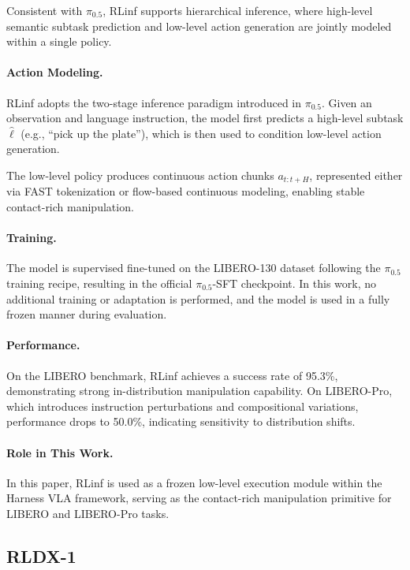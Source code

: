 \documentclass{article}
\begin{document}
Consistent with $\pi_{0.5}$, RLinf supports hierarchical inference, where high-level semantic subtask prediction and low-level action generation are jointly modeled within a single policy.

\paragraph{Action Modeling.}
RLinf adopts the two-stage inference paradigm introduced in $\pi_{0.5}$. Given an observation and language instruction, the model first predicts a high-level subtask $\hat{\ell}$ (e.g., “pick up the plate”), which is then used to condition low-level action generation.

The low-level policy produces continuous action chunks $a_{t:t+H}$, represented either via FAST tokenization or flow-based continuous modeling, enabling stable contact-rich manipulation.

\paragraph{Training.}
The model is supervised fine-tuned on the LIBERO-130 dataset following the $\pi_{0.5}$ training recipe, resulting in the official $\pi_{0.5}$-SFT checkpoint. In this work, no additional training or adaptation is performed, and the model is used in a fully frozen manner during evaluation.

\paragraph{Performance.}
On the LIBERO benchmark, RLinf achieves a success rate of 95.3\%, demonstrating strong in-distribution manipulation capability. On LIBERO-Pro, which introduces instruction perturbations and compositional variations, performance drops to 50.0\%, indicating sensitivity to distribution shifts.

\paragraph{Role in This Work.}
In this paper, RLinf is used as a frozen low-level execution module within the Harness VLA framework, serving as the contact-rich manipulation primitive for LIBERO and LIBERO-Pro tasks.

\subsection{RLDX-1}
\end{document}

